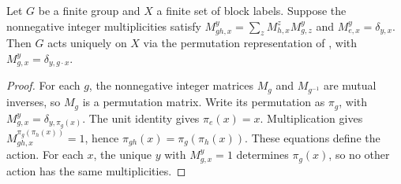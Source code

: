 \begin{lemma}%
    \label{thm:mpo_symmetry_group_action}
    \leanok
    Let $G$ be a finite group and $X$ a finite set of block labels. Suppose
    the nonnegative integer multiplicities satisfy
    $M_{gh,x}^y=\sum_z M_{h,x}^zM_{g,z}^y$ and
    $M_{e,x}^y=\delta_{y,x}$. Then $G$ acts uniquely on $X$ via the
    permutation representation of
    \cite[Section~4]{GarreRubio2023MPOSym}, with $M_{g,x}^y=\delta_{y,g\cdot x}$.
\end{lemma}

\begin{proof}
    \leanok
    For each $g$, the nonnegative integer matrices $M_g$ and $M_{g^{-1}}$
    are mutual inverses, so $M_g$ is a permutation matrix. Write its
    permutation as $\pi_g$, with $M_{g,x}^y=\delta_{y,\pi_g(x)}$.
    The unit identity gives $\pi_e(x)=x$. Multiplication gives
    $M_{gh,x}^{\pi_g(\pi_h(x))}=1$, hence
    $\pi_{gh}(x)=\pi_g(\pi_h(x))$. These equations define the action.
    For each $x$, the unique $y$ with $M_{g,x}^y=1$ determines $\pi_g(x)$,
    so no other action has the same multiplicities.
\end{proof}

